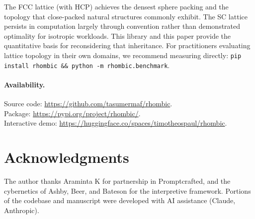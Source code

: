 \documentclass[11pt]{article}
\begin{document}
The FCC lattice (with HCP) achieves the densest sphere packing and
the topology that close-packed natural structures commonly exhibit. The SC
lattice persists in computation largely through convention rather than
demonstrated optimality for isotropic workloads. This
library and this paper provide the quantitative basis for
reconsidering that inheritance. For practitioners evaluating lattice
topology in their own domains, we recommend measuring directly:
\texttt{pip install rhombic \&\& python -m rhombic.benchmark}.

\paragraph{Availability.}
Source code: \url{https://github.com/tasumermaf/rhombic}.\\
Package: \url{https://pypi.org/project/rhombic/}.\\
Interactive demo: \url{https://huggingface.co/spaces/timotheospaul/rhombic}.

\section*{Acknowledgments}

The author thanks Araminta K for partnership in Promptcrafted, and
the cybernetics of Ashby, Beer, and Bateson for the interpretive
framework. Portions of the codebase and manuscript were developed
with AI assistance (Claude, Anthropic).



\end{document}
